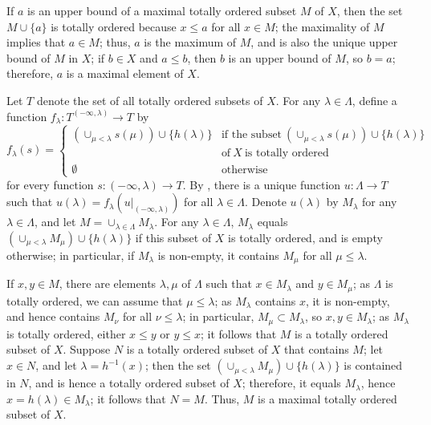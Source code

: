 \documentclass{article}
\begin{document}
\begin{solution}[\ref{exe:9d868h6m}]
  \label{sol:yfgula0x}
  If \(a\) is an upper bound of a maximal totally ordered subset \(M\)
  of \(X\), then the set \(M \cup \{ a \}\) is totally ordered because
  \(x \leq a\) for all \(x \in M\); the maximality of \(M\) implies
  that \(a \in M\); thus, \(a\) is the maximum of \(M\), and is also
  the unique upper bound of \(M\) in \(X\); if \(b \in X\) and
  \(a \leq b\), then \(b\) is an upper bound of \(M\), so \(b = a\);
  therefore, \(a\) is a maximal element of \(X\).

  Let \(T\) denote the set of all totally ordered subsets of \(X\).
  For any \(\lambda \in \Lambda\), define a function
  \(f_\lambda : T^{(-\infty, \lambda)} \to T\) by
  \begin{displaymath}
    f_\lambda(s) =
    \begin{cases}
      (\cup_{\mu < \lambda} s(\mu)) \cup \{ h(\lambda) \}
      & \text{if the subset} ~
        (\cup_{\mu < \lambda} s(\mu)) \cup \{ h(\lambda) \} \\
      & \text{of} ~ X ~ \text{is totally ordered} \\
      \emptyset
      & \text{otherwise}
    \end{cases}
  \end{displaymath}
  for every function \(s : (-\infty, \lambda) \to T\).  By
  , there is a unique function
  \(u : \Lambda \to T\) such that
  \(u(\lambda) = f_\lambda(u \vert_{(-\infty, \lambda)})\) for all
  \(\lambda \in \Lambda\).  Denote \(u(\lambda)\) by \(M_\lambda\) for
  any \(\lambda \in \Lambda\), and let
  \(M = \cup_{\lambda \in \Lambda} M_\lambda\).  For any
  \(\lambda \in \Lambda\), \(M_\lambda\) equals
  \((\cup_{\mu < \lambda} M_\mu) \cup \{ h(\lambda) \}\) if this
  subset of \(X\) is totally ordered, and is empty otherwise; in
  particular, if \(M_\lambda\) is non-empty, it contains \(M_\mu\) for
  all \(\mu \leq \lambda\).

  If \(x, y \in M\), there are elements \(\lambda, \mu\) of
  \(\Lambda\) such that \(x \in M_\lambda\) and \(y \in M_\mu\); as
  \(\Lambda\) is totally ordered, we can assume that
  \(\mu \leq \lambda\); as \(M_\lambda\) contains \(x\), it is
  non-empty, and hence contains \(M_\nu\) for all
  \(\nu \leq \lambda\); in particular, \(M_\mu \subset M_\lambda\), so
  \(x, y \in M_\lambda\); as \(M_\lambda\) is totally ordered, either
  \(x \leq y\) or \(y \leq x\); it follows that \(M\) is a totally
  ordered subset of \(X\).  Suppose \(N\) is a totally ordered subset
  of \(X\) that contains \(M\); let \(x \in N\), and let
  \(\lambda = h^{-1}(x)\); then the set
  \((\cup_{\mu < \lambda} M_\mu) \cup \{ h(\lambda) \}\) is contained
  in \(N\), and is hence a totally ordered subset of \(X\); therefore,
  it equals \(M_\lambda\), hence \(x = h(\lambda) \in M_\lambda\); it
  follows that \(N = M\).  Thus, \(M\) is a maximal totally ordered
  subset of \(X\).
\end{solution}
\end{document}
